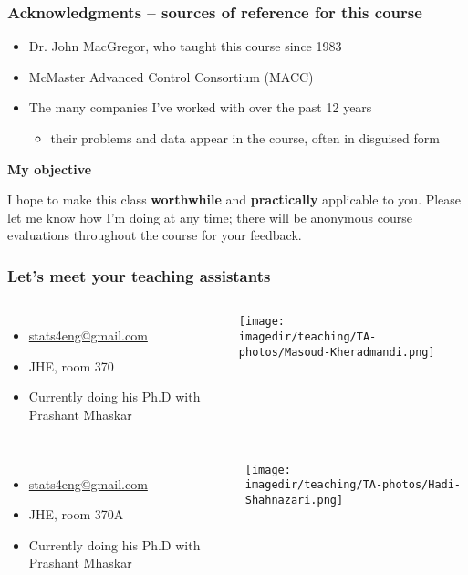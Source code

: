 \begin{frame}\frametitle{Acknowledgments -- sources of reference for this course}
	\begin{itemize}
		\item	Dr. John MacGregor, who taught this course since 1983
		\item	McMaster Advanced Control Consortium (MACC)
		\item	The many companies I've worked with over the past 12 years
			\begin{itemize}
				\item	their problems and data appear in the course, often in disguised form
			\end{itemize}
	\end{itemize}
	
	\vspace{30pt}
	\textbf{{\color{myOrange}My objective}}

	\vspace{6pt}
	I hope to make this class \textbf{worthwhile} and \textbf{practically} applicable to you. Please let me know how I'm doing at any time; there will be anonymous course evaluations throughout the course for your feedback.
\end{frame}

\begin{frame}\frametitle{Let's meet your teaching assistants}
	\vspace{12pt}
	\begin{columns}[t]
			{\color{myGreen}{Masoud Kheradmandi}}
			\begin{itemize}
				\item	\url{stats4eng@gmail.com}
				\item	JHE, room 370
				\item	Currently doing his Ph.D with Prashant Mhaskar
			\end{itemize}
			\vspace{-1cm}
			\centerline{\texttt{[image: \\imagedir/teaching/TA-photos/Masoud-Kheradmandi.png]}}
	\end{columns}		
	
	\vspace{24pt}
	\begin{columns}[t]
			{\color{myGreen}{Hadi Shahnazari}}
			\begin{itemize}
				\item	\url{stats4eng@gmail.com}
				\item	JHE, room 370A
				\item	Currently doing his Ph.D with Prashant Mhaskar
			\end{itemize}
		
			\vspace{-0.5cm}
			\centerline{\texttt{[image: \\imagedir/teaching/TA-photos/Hadi-Shahnazari.png]}}
	\end{columns}
	\vspace{24pt}

	{\color{myOrange}{Office hours for both TAs are by email appointment}}
\end{frame}

